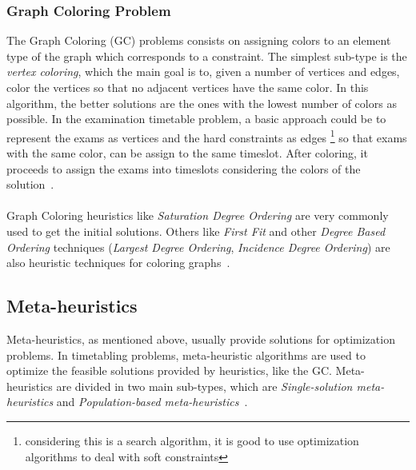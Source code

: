 \subsubsection{Graph Coloring Problem}
The Graph Coloring (GC) problems consists on assigning colors to an element type of the graph which corresponds to a constraint. The simplest sub-type is the \textit{vertex coloring}, which the main goal is to, given a number of vertices and edges, color the vertices so that no adjacent vertices have the same color. In this algorithm, the better solutions are the ones with the lowest number of colors as possible. In the examination timetable problem, a basic approach could be to represent the exams as vertices and the hard constraints as edges \footnote{considering this is a search algorithm, it is good to use optimization algorithms to deal with soft constraints} so that exams with the same color, can be assign to the same timeslot. After coloring, it proceeds to assign the exams into timeslots considering the colors of the solution~\cite{Qu2009}.\\
\\
Graph Coloring heuristics like \textit{Saturation Degree Ordering} are very commonly used to get the initial solutions. Others like \textit{First Fit} and other \textit{Degree Based Ordering} techniques (\textit{Largest Degree Ordering}, \textit{Incidence Degree Ordering}) are also heuristic techniques for coloring graphs~\cite{Carter1996}.\\


\subsection{Meta-heuristics}
Meta-heuristics, as mentioned above, usually provide solutions for optimization problems. In timetabling problems, meta-heuristic algorithms are used to optimize the feasible solutions provided by heuristics, like the GC. Meta-heuristics are divided in two main sub-types, which are \textit{Single-solution meta-heuristics} and \textit{Population-based meta-heuristics}~\cite{Talbi2009}.\\

